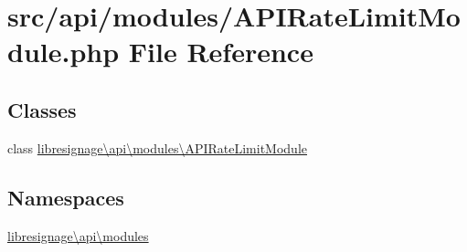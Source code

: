 \hypertarget{APIRateLimitModule_8php}{}\section{src/api/modules/\+A\+P\+I\+Rate\+Limit\+Module.php File Reference}
\label{APIRateLimitModule_8php}
\subsection*{Classes}
\begin{DoxyCompactItemize}
\item 
class \hyperlink{classlibresignage_1_1api_1_1modules_1_1APIRateLimitModule}{libresignage\textbackslash{}api\textbackslash{}modules\textbackslash{}\+A\+P\+I\+Rate\+Limit\+Module}
\end{DoxyCompactItemize}
\subsection*{Namespaces}
\begin{DoxyCompactItemize}
\item 
 \hyperlink{namespacelibresignage_1_1api_1_1modules}{libresignage\textbackslash{}api\textbackslash{}modules}
\end{DoxyCompactItemize}
